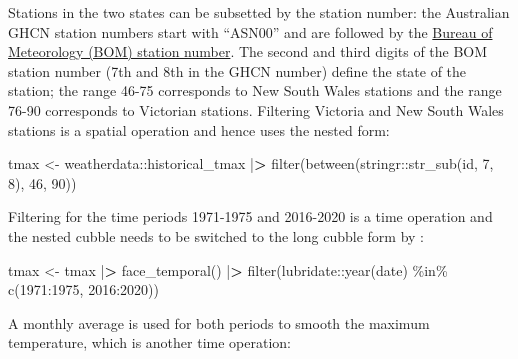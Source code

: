 \documentclass{article}
\newenvironment{Shaded}{\begin{snugshade}}{\end{snugshade}}
\newcommand{\DecValTok}[1]{\textcolor[rgb]{0.00,0.00,0.81}{#1}}
\newcommand{\ErrorTok}[1]{\textcolor[rgb]{0.64,0.00,0.00}{\textbf{#1}}}
\newcommand{\FunctionTok}[1]{\textcolor[rgb]{0.00,0.00,0.00}{#1}}
\newcommand{\NormalTok}[1]{#1}
\newcommand{\OtherTok}[1]{\textcolor[rgb]{0.56,0.35,0.01}{#1}}
\newcommand{\SpecialCharTok}[1]{\textcolor[rgb]{0.00,0.00,0.00}{#1}}
\begin{document}
Stations in the two states can be subsetted by the station number: the Australian GHCN station numbers start with ``ASN00'' and are followed by the \href{http://www.bom.gov.au/climate/cdo/about/site-num.shtml}{Bureau of Meteorology (BOM) station number}. The second and third digits of the BOM station number (7th and 8th in the GHCN number) define the state of the station; the range 46-75 corresponds to New South Wales stations and the range 76-90 corresponds to Victorian stations. Filtering Victoria and New South Wales stations is a spatial operation and hence uses the nested form:

\begin{Shaded}
\begin{Highlighting}[]
\NormalTok{tmax }\OtherTok{\textless{}{-}}\NormalTok{ weatherdata}\SpecialCharTok{::}\NormalTok{historical\_tmax }\SpecialCharTok{|}\ErrorTok{\textgreater{}}
  \FunctionTok{filter}\NormalTok{(}\FunctionTok{between}\NormalTok{(stringr}\SpecialCharTok{::}\FunctionTok{str\_sub}\NormalTok{(id, }\DecValTok{7}\NormalTok{, }\DecValTok{8}\NormalTok{), }\DecValTok{46}\NormalTok{, }\DecValTok{90}\NormalTok{))}
\end{Highlighting}
\end{Shaded}

Filtering for the time periods 1971-1975 and 2016-2020 is a time operation and the nested cubble needs to be switched to the long cubble form by :

\begin{Shaded}
\begin{Highlighting}[]
\NormalTok{tmax }\OtherTok{\textless{}{-}}\NormalTok{ tmax }\SpecialCharTok{|}\ErrorTok{\textgreater{}}
  \FunctionTok{face\_temporal}\NormalTok{() }\SpecialCharTok{|}\ErrorTok{\textgreater{}}
  \FunctionTok{filter}\NormalTok{(lubridate}\SpecialCharTok{::}\FunctionTok{year}\NormalTok{(date) }\SpecialCharTok{\%in\%} \FunctionTok{c}\NormalTok{(}\DecValTok{1971}\SpecialCharTok{:}\DecValTok{1975}\NormalTok{, }\DecValTok{2016}\SpecialCharTok{:}\DecValTok{2020}\NormalTok{))}
\end{Highlighting}
\end{Shaded}

A monthly average is used for both periods to smooth the maximum temperature, which is another time operation:
\end{document}
